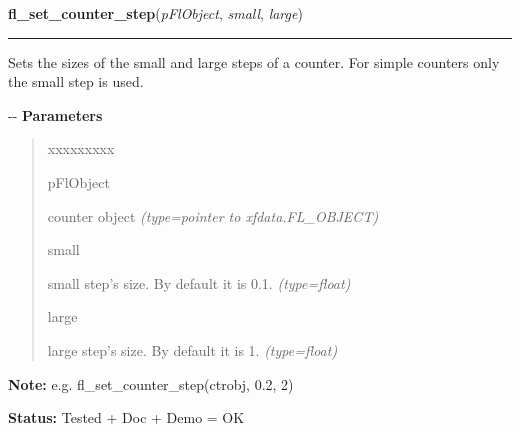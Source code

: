 \hspace{.8\funcindent}\begin{boxedminipage}{\funcwidth}

    \raggedright \textbf{fl\_set\_counter\_step}(\textit{pFlObject}, \textit{small}, \textit{large})

    \vspace{-1.5ex}

    \rule{\textwidth}{0.5\fboxrule}
\setlength{\parskip}{2ex}

Sets the sizes of the small and large steps of a counter. For simple
counters only the small step is used.

-{}-
\setlength{\parskip}{1ex}
      \textbf{Parameters}
      \vspace{-1ex}

      \begin{quote}
        \begin{Ventry}{xxxxxxxxx}

          \item[pFlObject]


counter object
            {\it (type=pointer to xfdata.FL\_OBJECT)}

          \item[small]


small step's size. By default it is 0.1.
            {\it (type=float)}

          \item[large]


large step's size. By default it is 1.
            {\it (type=float)}

        \end{Ventry}

      \end{quote}

\textbf{Note:} 
e.g. fl\_set\_counter\_step(ctrobj, 0.2, 2)


\textbf{Status:} 
Tested + Doc + Demo = OK


    \end{boxedminipage}

    \label{xformslib:flcounter:fl_set_counter_precision}

    \vspace{0.5ex}

